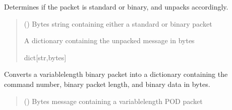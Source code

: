 \documentclass[letterpaper,10pt,english]{sphinxmanual}
\begin{document}
\begin{fulllineitems}
\begin{fulllineitems}
\label{\detokenize{BasicPodProtocol:BasicPodProtocol.POD_Basics.UnpackPODpacket}}
\pysigstartsignatures
{}
\pysigstopsignatures
\sphinxAtStartPar
Determines if the packet is standard or binary, and unpacks accordingly.
\begin{quote}\begin{description}
\sphinxAtStartPar
{} () \textendash{} Bytes string containing either a standard or binary packet

\sphinxAtStartPar
A dictionary containing the unpacked message in bytes

\sphinxAtStartPar
dict{[}str,bytes{]}

\end{description}\end{quote}

\end{fulllineitems}


\begin{fulllineitems}
\label{\detokenize{BasicPodProtocol:BasicPodProtocol.POD_Basics.UnpackPODpacket_Binary}}
\pysigstartsignatures
{}
\pysigstopsignatures
\sphinxAtStartPar
Converts a variable\sphinxhyphen{}length binary packet into a dictionary containing the command
number, binary packet length, and binary data in bytes.
\begin{quote}\begin{description}
\sphinxAtStartPar
{} () \textendash{} Bytes message containing a variable\sphinxhyphen{}length POD packet


\end{description}
\end{quote}
\end{fulllineitems}
\end{fulllineitems}
\end{document}
